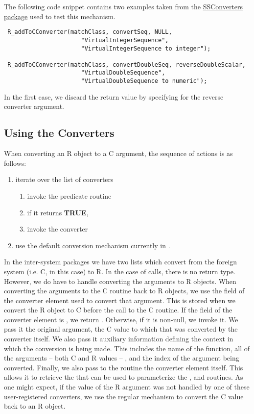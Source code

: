 \documentclass{article}
\begin{document}
The following code snippet contains two examples taken from the
\href{http://cm.bell-labs.com/stat/duncan/SCConverters/SCConverters_1.0-0.tar.gz}{SSConverters
package} used to test this mechanism.
\begin{verbatim}
 R_addToCConverter(matchClass, convertSeq, NULL, 
                      "VirtualIntegerSequence",
                      "VirtualIntegerSequence to integer");

 R_addToCConverter(matchClass, convertDoubleSeq, reverseDoubleScalar, 
                      "VirtualDoubleSequence", 
                      "VirtualDoubleSequence to numeric");

\end{verbatim}
In the first case, we discard the return value
by specifying \CNull{} for the reverse converter argument.

\subsection{Using the Converters}

When converting an R object to a C argument, the sequence of actions
is as follows:
\begin{enumerate}
\item iterate over the list of converters
  \begin{enumerate}
  \item invoke the predicate routine 
  \item if it returns \textbf{TRUE}, 
  \item  invoke the converter
  \end{enumerate}
\item use the default conversion mechanism
  currently in .
\end{enumerate}


In the inter-system packages we have two lists which convert from the
foreign system (i.e. C, in this case) to R.  In the case of
 calls, there is no return type. However, we do have to
handle converting the arguments to R objects.  When converting the
arguments to the C routine back to R objects, we use the
 field of the converter element used to convert that
argument. This is stored when we convert the R object to C before the
call to the C routine.  If the  field of the converter
element is \CNull, we return .  Otherwise, if it
is non-null, we invoke it.  We pass it the original argument, the C
value to which that was converted by the converter itself.  We also
pass it auxiliary information defining the context in which the
conversion is being made. This includes the name of the function, all
of the arguments -- both C and R values -- , and the index of the
argument being converted. Finally, we also pass to the
 routine the converter element itself.  This allows
it to retrieve the  that can be used to parameterize
the ,  and 
routines.  As one might expect, if the value of the R argument was not
handled by one of these user-registered converters, we use the regular
mechanism to convert the C value back to an R object.
\end{document}
